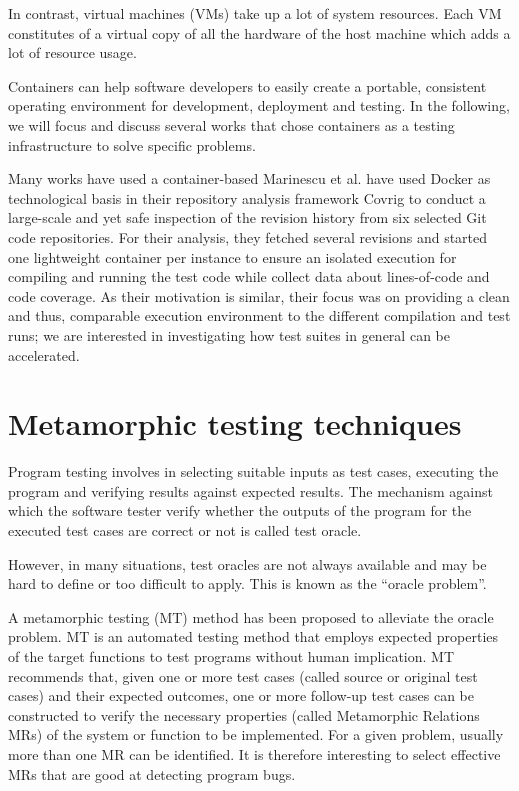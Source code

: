 In contrast, virtual machines (VMs) take up a lot of system resources. Each VM constitutes of a virtual copy of all the hardware of the host machine which adds a lot of resource usage. 


Containers can help software developers to easily create a portable, consistent operating environment for development, deployment and testing. In the following, we will focus and discuss several works that chose containers as a testing infrastructure to solve specific problems.


Many works have used a container-based Marinescu et al.\cite{marinescu2014covrig} have used Docker as technological basis in their repository analysis framework Covrig to conduct a large-scale and yet safe inspection of the revision history from six selected Git code repositories. For their analysis, they fetched several revisions and started one lightweight container per instance to ensure an isolated execution for compiling and running the test code while collect data about lines-of-code and code coverage. As their motivation is similar, their focus was on providing a clean and thus, comparable execution environment to the different compilation and test runs; we are interested in investigating how test suites in general can be accelerated.

\section{Metamorphic testing techniques}
Program testing involves in selecting suitable inputs as test cases, executing the program and verifying results against expected results. The mechanism against which the software tester verify whether the outputs of the program for the executed test cases are correct or not is called test oracle. 

However, in many situations, test oracles are not always available and may be hard to define or too difficult to apply\cite{barr2015oracle}. This is known as the “oracle problem”.

A metamorphic testing (MT) method has been proposed to alleviate the oracle problem\cite{chen2004case}. MT is an automated testing method that employs expected properties of the target functions to test programs without human implication. 
MT recommends that, given one or more test cases (called source or original test cases) and their expected outcomes, one or more follow-up test cases can be constructed to verify the necessary properties (called Metamorphic Relations MRs) of the system or function to be implemented.
For a given problem, usually more than one MR can be identified. It is therefore interesting to select effective MRs that are good at detecting program bugs.
